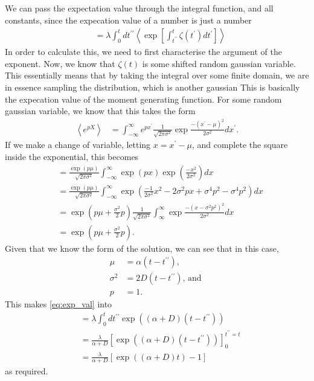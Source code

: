 \documentclass[11pt,a4paper]{article}
\begin{document}
We can pass the expectation value through the integral function, and all constants, since the expecation value of a number is just a number
\begin{align}\label{eq:exp_val}
&= \lambda \int_0^t dt^{\prime \prime}  \left<\exp[ \int_{t^{\prime \prime}}^{t} \zeta(t^\prime)  dt^{\prime} ]\right>
\end{align} 
In order to calculate this, we need to first characterise the argument of the exponent. Now, we know that $\zeta(t)$ is some shifted random gaussian variable. This essentially means that by taking the integral over some finite domain, we are in essence sampling the distribution, which is another gaussian 
This is basically the expecation value of the moment generating function. For some random gaussian variable, we know that this takes the form 
\begin{align*}
  \left< e^{pX} \right> &= \int_{-\infty}^\infty e^{px^\prime} \frac{1}{\sqrt{2 \pi \sigma^2}} \exp{\frac{-(x^\prime - \mu)^2}{2 \sigma^2}} d x^\prime.
\end{align*}
If we make a change of variable, letting $x = x^\prime - \mu$, and complete the square inside the exponential, this becomes
\begin{align*}
  &= \frac{\exp(p \mu)}{\sqrt{2 \pi \sigma^2}} \int_{-\infty}^{\infty} \exp(px) \exp(\frac{-x^2}{2 \sigma^2}) dx \\ 
  &= \frac{\exp(p \mu)}{\sqrt{2 \pi \sigma^2}} \int_{-\infty}^{\infty} \exp(\frac{-1}{2 \sigma^2} {x^2 - 2 \sigma^2 p x + \sigma^4 p^2 - \sigma^4 p^2}) dx \\
  &= \exp(p \mu + \frac{\sigma^2}{2} p) \frac{1}{\sqrt{2 \pi \sigma^2}} 
  \int_{\infty}^\infty \exp{\frac{- (x-\sigma^2 p^2)^2}{2 \sigma^2}} dx\\
  &= \exp(p \mu + \frac{\sigma^2}{2} p).
\end{align*}
Given that we know the form of the solution, we can see that in this case, 
\begin{align*}
  \mu &= \alpha ( t - t^{\prime \prime}), \\
  \sigma^2 &= 2D ( t - t^{\prime \prime}) \text{, and } \\
  p &= 1.
\end{align*}
This makes \eqref{eq:exp_val} into 
\begin{align*}
  &= \lambda \int_0^t dt^{\prime \prime} \exp((\alpha+D) (t - t^{\prime \prime}) ) \\
  &= \frac{\lambda}{\alpha + D} \left[ \exp((\alpha + D)(t - t^{\prime \prime}))\right]_0^{t^{\prime \prime} = t} \\
  &= \frac{\lambda}{\alpha + D} [\exp((\alpha+D)t) - 1]
\end{align*}
as required.
\end{document}
